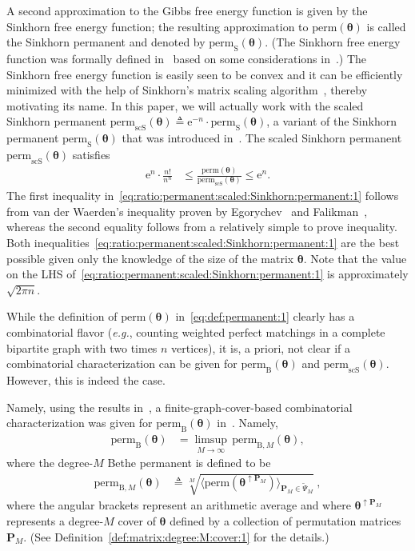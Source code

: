 \documentclass[journal,lettersize,twocolumn]{IEEEtran} %
\newcommand{\matr}[1]{ \bm{#1} }
\newcommand{\defeq}{ \triangleq }
\newcommand{\perm}{ \mathrm{perm} }
\newcommand{\permb}{ \mathrm{perm}_{\mathrm{B}} }
\newcommand{\permbM}[1]{\perm_{ \mathrm{B}, #1 }}
\newcommand{\perms}{ \mathrm{perm}_{\mathrm{S}} }
\newcommand{\permscs}{ \mathrm{perm}_{\mathrm{scS}} }
\newcommand{\mtheta}{\matr{\theta}}
\newcommand{\mP}{\matr{P}}
\newcommand{\tPsi}{\tilde{\Psi}}
\newcommand{\eg}{\textit{e.g.}}
\newcommand{\e}{\mathrm{e}}
\begin{document}
%

A second approximation to the Gibbs free energy function is given by the
Sinkhorn free energy function; the resulting approximation to $\perm(\mtheta)$
is called the Sinkhorn permanent and denoted by $\perms(\mtheta)$. (The
Sinkhorn free energy function was formally defined in~\cite{Vontobel2014}
based on some considerations in~\cite{Huang2009}.) The Sinkhorn free energy
function is easily seen to be convex and it can be efficiently minimized with
the help of Sinkhorn's matrix scaling algorithm~\cite{Linial2000}, thereby
motivating its name. In this paper, we will actually work with the scaled
Sinkhorn permanent $\permscs(\mtheta) \defeq \e^{-n} \cdot \perms(\mtheta)$, a
variant of the Sinkhorn permanent $\perms(\mtheta)$ that was introduced
in~\cite{N.Anari2021}. The scaled Sinkhorn permanent $\permscs(\mtheta)$
satisfies
\begin{align}
  \e^n \cdot \frac{n!}{n^n}
    &\leq 
       \frac{\perm(\mtheta)}{\permscs(\mtheta)}
     \leq 
       \e^n .
         \label{eq:ratio:permanent:scaled:Sinkhorn:permanent:1}
\end{align}
The first inequality in~\eqref{eq:ratio:permanent:scaled:Sinkhorn:permanent:1}
follows from van der Waerden's inequality proven by
Egorychev~\cite{Egorychev1981} and Falikman~\cite{Falikman1981}, whereas the
second equality follows from a relatively simple to prove inequality. Both
inequalities~\eqref{eq:ratio:permanent:scaled:Sinkhorn:permanent:1} are the
best possible given only the knowledge of the size of the
matrix $\mtheta$. Note that the value on the LHS
of~\eqref{eq:ratio:permanent:scaled:Sinkhorn:permanent:1} is approximately
$\sqrt{2 \pi n}$.

%

While the definition of $\perm(\mtheta)$ in~\eqref{eq:def:permanent:1} clearly
has a combinatorial flavor (\eg, counting weighted perfect matchings in a
complete bipartite graph with two times $n$ vertices), it is, a priori, not
clear if a combinatorial characterization can be given for $\permb(\mtheta)$
and $\permscs(\mtheta)$. However, this is indeed the case.

%

Namely, using the results in~\cite{Vontobel2013}, a finite-graph-cover-based
combinatorial characterization was given for $\permb(\mtheta)$
in~\cite{Vontobel2013a}. Namely,
\begin{align}
  \permb(\mtheta)
    &= \limsup_{M \to \infty} \,
         \permbM{M}(\mtheta),
           \label{eq:bethe:perm:as:limit:1}
\end{align}
where the degree-$M$ Bethe permanent is defined to be
\begin{align}
  \permbM{M}(\mtheta)
    &\defeq
      \sqrt[M]{
        \bigl\langle
          \perm( \mtheta^{\uparrow \mP_{M}} )
        \bigr\rangle_{\mP_{M} \in \tPsi_{M} }
     } \ , 
       \label{eq:def:degree:M:Bethe:permanent:1}
\end{align}
where the angular brackets represent an arithmetic average and where
$\mtheta^{\uparrow \mP_{M}}$ represents a degree-$M$ cover of $\mtheta$
defined by a collection of permutation matrices $\mP_{M}$. (See
Definition~\ref{def:matrix:degree:M:cover:1} for the details.)
\end{document}
